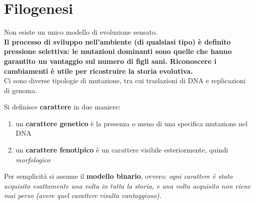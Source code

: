\documentclass[a4paper,12pt, oneside]{book}
\begin{document}
\chapter{Filogenesi}
Non esiste un unico modello di evoluzione sensato. \\
\textbf{Il processo di sviluppo nell’ambiente (di qualsiasi tipo) è
  definito pressione selettiva: le mutazioni 
  dominanti sono quelle che hanno garantito un vantaggio sul numero di
  figli sani. Riconoscere i 
  cambiamenti è utile per ricostruire la storia evolutiva.}\\
Ci sono diverse tipologie di mutazione, tra cui traslazioni di DNA e
replicazioni di genoma.
\begin{definizione}
  Si definisce \textbf{carattere} in due maniere:
  \begin{enumerate}
    \item un \textbf{carattere genetico} è la presenza o meno di
    una specifica mutazione nel DNA
    \item un \textbf{carattere fenotipico} è un carattere visibile
    esteriormente, quindi \textit{morfologico}
  \end{enumerate}
\end{definizione}
Per semplicità si assume il \textbf{modello binario}, ovvero:
\textit{ogni carattere è stato acquisito esattamente una volta in tutta la
  storia, e una volta acquisito non viene mai perso (avere quel
  carattere risulta vantaggioso).}
\end{document}

